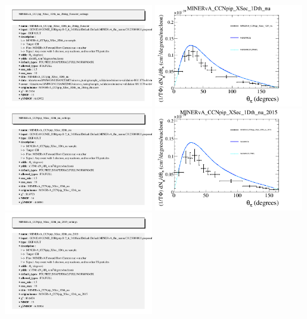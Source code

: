 \documentclass{article}
\begin{document}
\includegraphics[width=0.49\textwidth]{figures/nuisance_MINERvA_CC1pip_XSec_1Dth_nu_20deg_fluxcorr_info.png}
\centering
\includegraphics[width=0.49\textwidth]{figures/nuisance_MINERvA_CCNpip_XSec_1Dth_nu_comp.png}
\includegraphics[width=0.49\textwidth]{figures/nuisance_MINERvA_CCNpip_XSec_1Dth_nu_info.png}
\centering
\includegraphics[width=0.49\textwidth]{figures/nuisance_MINERvA_CCNpip_XSec_1Dth_nu_2015_comp.png}
\includegraphics[width=0.49\textwidth]{figures/nuisance_MINERvA_CCNpip_XSec_1Dth_nu_2015_info.png}
\end{document}
